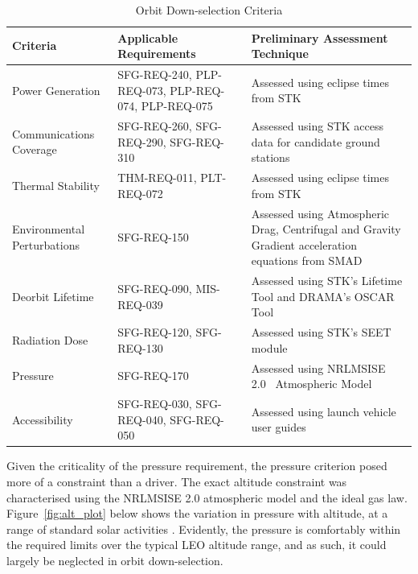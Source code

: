 \documentclass[a4paper, 11pt, conference]{IEEEtran}
\begin{document}
\begin{table}[H]
    \centering
    \caption{Orbit Down-selection Criteria}
    \renewcommand{\arraystretch}{1.2} %
    \begin{tabularx}{\textwidth}{
        l
        >{\hsize=0.61\hsize}X
        >{\hsize=1.39\hsize}X
    }
        \toprule
        \textbf{Criteria} & \textbf{Applicable Requirements} & \textbf{Preliminary Assessment Technique}\\
        \midrule
        Power Generation & SFG-REQ-240, PLP-REQ-073, PLP-REQ-074, PLP-REQ-075 & Assessed using eclipse times from STK\\
        Communications Coverage & SFG-REQ-260, SFG-REQ-290, SFG-REQ-310 & Assessed using STK access data for candidate ground stations\\
        Thermal Stability & THM-REQ-011, PLT-REQ-072 & Assessed using eclipse times from STK\\
        Environmental Perturbations & SFG-REQ-150 & Assessed using Atmospheric Drag, Centrifugal and Gravity Gradient acceleration equations from SMAD\label{nom:smad} \cite{wertz_space_1999}\\
        Deorbit Lifetime & SFG-REQ-090, MIS-REQ-039 & Assessed using STK's Lifetime Tool and DRAMA's OSCAR Tool \\
        Radiation Dose & SFG-REQ-120, SFG-REQ-130 & Assessed using STK's SEET\label{nom:seet_stk} module \\
        Pressure & SFG-REQ-170 & Assessed using NRLMSISE 2.0~\cite{noauthor_nrlmsis_2025} Atmospheric Model\\
        Accessibility & SFG-REQ-030, SFG-REQ-040, SFG-REQ-050 & Assessed using launch vehicle user guides\\
        \bottomrule
    \end{tabularx}
    \label{tab:orbit_criteria}
\end{table}

Given the criticality of the pressure requirement, the pressure criterion posed more of a constraint than a driver. The exact altitude constraint was characterised using the NRLMSISE\label{nom:nrlmsise} 2.0 atmospheric model \cite{noauthor_nrlmsis_2025} and the ideal gas law.  Figure~\ref{fig:alt_plot} below shows the variation in pressure with altitude, at a range of standard solar activities \cite{noauthor_ecss-e-st-10-04c_nodate}. Evidently, the pressure is comfortably within the required limits over the typical LEO\label{nom:leo} altitude range, and as such, it could largely be neglected in orbit down-selection.
\end{document}
